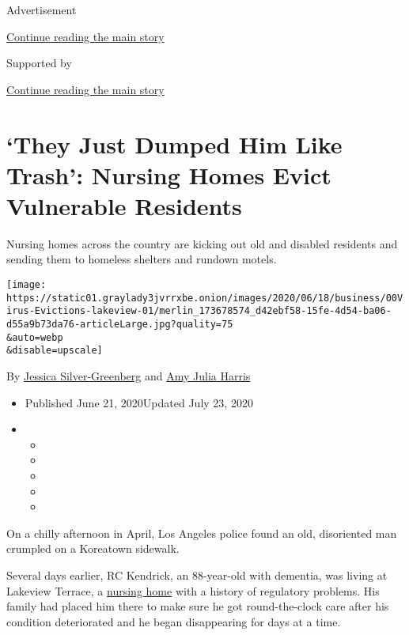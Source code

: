 Advertisement

\protect\hyperlink{after-top}{Continue reading the main story}

Supported by

\protect\hyperlink{after-sponsor}{Continue reading the main story}

\hypertarget{they-just-dumped-him-like-trash-nursing-homes-evict-vulnerable-residents}{%
\section{`They Just Dumped Him Like Trash': Nursing Homes Evict
Vulnerable
Residents}\label{they-just-dumped-him-like-trash-nursing-homes-evict-vulnerable-residents}}

Nursing homes across the country are kicking out old and disabled
residents and sending them to homeless shelters and rundown motels.

\texttt{[image: https://static01.graylady3jvrrxbe.onion/images/2020/06/18/business/00Virus-Evictions-lakeview-01/merlin\_173678574\_d42ebf58-15fe-4d54-ba06-d55a9b73da76-articleLarge.jpg?quality=75\\\&auto=webp\\\&disable=upscale]}

By
\href{https://www.nytimes3xbfgragh.onion/by/jessica-silver-greenberg}{Jessica
Silver-Greenberg} and
\href{https://www.nytimes3xbfgragh.onion/by/amy-julia-harris}{Amy Julia
Harris}

\begin{itemize}
\item
  Published June 21, 2020Updated July 23, 2020
\item
  \begin{itemize}
  \item
  \item
  \item
  \item
  \item
  \end{itemize}
\end{itemize}

On a chilly afternoon in April, Los Angeles police found an old,
disoriented man crumpled on a Koreatown sidewalk.

Several days earlier, RC Kendrick, an 88-year-old with dementia, was
living at Lakeview Terrace, a
\href{https://www.nytimes3xbfgragh.onion/2020/07/23/nyregion/nursing-homes-deaths-cuomo.html}{nursing
home} with a history of regulatory problems. His family had placed him
there to make sure he got round-the-clock care after his condition
deteriorated and he began disappearing for days at a time.

